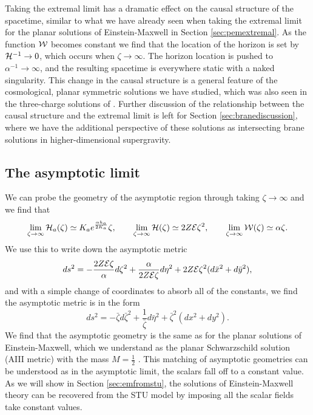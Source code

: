 Taking the extremal limit has a dramatic effect on the causal structure of the spacetime, similar to what we have already seen when taking the extremal limit for the planar solutions of Einstein-Maxwell in Section \ref{sec:pemextremal}. As the function ${\cal W}$ becomes constant we find that the location of the horizon is set by ${\cal H}^{-1} \rightarrow 0$, which occurs when $\zeta \rightarrow \infty$. The horizon location is pushed to $\alpha^{-1} \rightarrow \infty$, and the resulting spacetime is everywhere static with a naked singularity. This change in the causal structure is a general feature of the cosmological, planar symmetric solutions we have studied, which was also seen in the three-charge solutions of \cite{Gutowski:2019iyo}. Further discussion of the relationship between the causal structure and the extremal limit is left for Section \ref{sec:branediscussion}, where we have the additional perspective of these solutions as intersecting brane solutions in higher-dimensional supergravity.


\subsection{The asymptotic limit}

We can probe the geometry of the asymptotic region through taking $\zeta \rightarrow \infty$ and we find that
\begin{equation*}
  \lim_{\zeta \rightarrow \infty} {\cal H}_a(\zeta) \simeq K_a e^{\frac{\alpha h_a}{2 K_a}}\zeta, \qquad \lim_{\zeta \rightarrow \infty} {\cal H}(\zeta) \simeq 2 Z {\cal E} \zeta^2, \qquad \lim_{\zeta \rightarrow \infty} {\cal W}(\zeta) \simeq \alpha \zeta.
\end{equation*}
We use this to write down the asymptotic metric
\begin{equation}
\label{eq:stuasymptotic}
  ds^2 = - \frac{2 Z {\cal E} \zeta}{\alpha} d\zeta^2 + \frac{\alpha}{2 Z {\cal E} \zeta} d\eta^2 + 2 Z {\cal E} \zeta^2 (d\bar{x}^2 + d\bar{y}^2) ,
\end{equation}
and with a simple change of coordinates to absorb all of the constants, we find the asymptotic metric is in the form
\begin{equation}
\label{eq:asymet}
  ds^2 = - \bar{\zeta} d\bar{\zeta}^2 + \frac{1}{\bar{\zeta}} d\bar{\eta}^2 + \bar{\zeta}^2 (d{x}^2 + d{y}^2).
\end{equation}
We find that the asymptotic geometry is the same as for the planar solutions of Einstein-Maxwell, which we understand as the planar Schwarzschild solution (AIII metric) with the mass $M=\frac{1}{2}$ \cite{Griffiths:2009dfa}. This matching of asymptotic geometries can be understood as in the asymptotic limit, the scalars fall off to a constant value. As we will show in Section \ref{sec:emfromstu}, the solutions of Einstein-Maxwell theory can be recovered from the STU model by imposing all the scalar fields take constant values.

